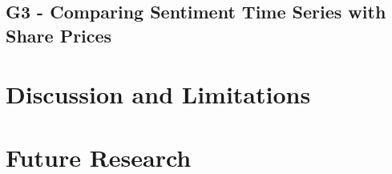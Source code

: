 \subsection{G3 - Comparing Sentiment Time Series with Share Prices}
\label{ss:conclusion-summary-g3}



\section{Discussion and Limitations}
\label{s:conclusions-discussion}

\section{Future Research}
\label{s:conclusions-future}

